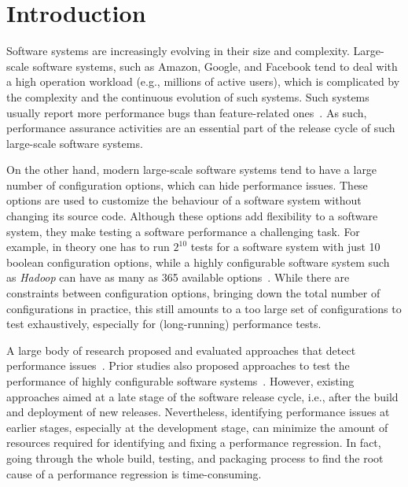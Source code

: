 
\section{Introduction}
\label{sec:intro}
Software systems are increasingly evolving in their size and complexity.
Large-scale software systems, such as Amazon, Google, and Facebook tend to deal with a high operation workload (e.g., millions of active users), which is complicated by the complexity and the continuous evolution of such systems. Such systems usually report more performance bugs than feature-related ones~\cite{weyuker2000experience}. As such, performance assurance activities are an essential part of the release cycle of such large-scale software systems.

On the other hand, modern large-scale software systems tend to have a large number of configuration options, which can hide performance issues. %
These options are used to customize the behaviour of a software system without changing its source code. Although these options add flexibility to a software system, they make testing a software performance a challenging task. For example, in theory one has to run $2^
{10}$ tests for a software system with just 10 boolean configuration options, while a highly configurable software system such as \emph{Hadoop} can have as many as 365 available options~\cite{tse}. While there are constraints between configuration options, bringing down the total number of configurations in practice, this still amounts to a too large set of configurations to test exhaustively, especially for (long-running) performance tests.
 
A large body of research proposed and evaluated approaches that detect performance issues~\cite{Nguyen:2012:ADP,nguyen2011automated,Nguyen:2014:ICS,foo2010mining,DBLP:conf/icse/FooJAHZF15}. Prior studies also proposed approaches to test the performance of highly configurable software systems~\cite{DBLP:journals/dt/SaxenaFHMYM00,wu2010performance,DBLP:journals/ese/HalinNADPB19}. However, existing approaches aimed at a late stage of the software release cycle, i.e., after the build and deployment of new releases. Nevertheless, identifying performance issues at earlier stages, especially at the development stage, can minimize the amount of resources required for identifying and fixing a performance regression. In fact, going through the whole build, testing, and packaging process to find the root cause of a performance regression is time-consuming. %


